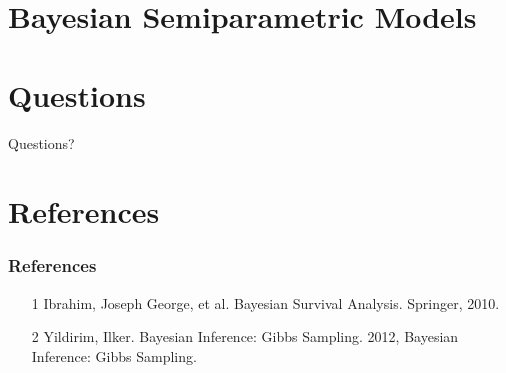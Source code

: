 \documentclass{beamer}
\begin{document}
\section{Bayesian Semiparametric Models}
\begin{frame}

\end{frame}

\section{Questions}
\begin{frame}[c]
\begin{center}
\Huge
Questions? 
\end{center}
\end{frame}

\section{References}
\begin{frame}
\frametitle{References}
\begin{enumerate}
\item[1] Ibrahim, Joseph George, et al. Bayesian Survival Analysis. Springer, 2010.
\item[2] Yildirim, Ilker. Bayesian Inference: Gibbs Sampling. 2012, Bayesian Inference: Gibbs Sampling.
\end{enumerate}
\end{frame}
\end{document}
